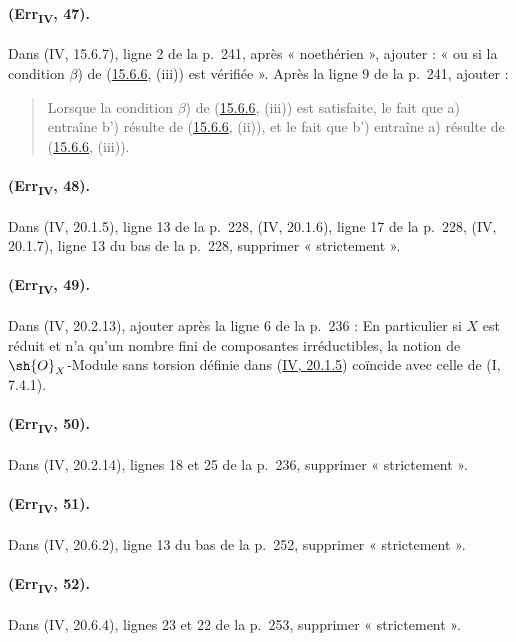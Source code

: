 \paragraph{(Err\textsubscript{IV}, 47).}
Dans (IV, 15.6.7), ligne 2 de la p.~241, après « noethérien », ajouter :
« ou si la condition $\beta$) de
({\hyperlink{ega4.c04.prop.15-6-6}{15.6.6}}, (iii)) est vérifiée ».
Après la ligne 9 de la p.~241, ajouter :
\begin{quote}
Lorsque la condition $\beta$) de
({\hyperlink{ega4.c04.prop.15-6-6}{15.6.6}}, (iii)) est satisfaite, le
fait que a) entraîne b') résulte de
({\hyperlink{ega4.c04.prop.15-6-6}{15.6.6}}, (ii)), et le fait que b')
entraîne a) résulte de
({\hyperlink{ega4.c04.prop.15-6-6}{15.6.6}}, (iii)).
\end{quote}

\paragraph{(Err\textsubscript{IV}, 48).}
Dans (IV, 20.1.5), ligne 13 de la p.~228, (IV, 20.1.6), ligne 17 de la
p.~228, (IV, 20.1.7), ligne 13 du bas de la p.~228, supprimer
« strictement ».

\paragraph{(Err\textsubscript{IV}, 49).}
Dans (IV, 20.2.13), ajouter après la ligne 6 de la p.~236 : En
particulier si $X$ est réduit et n'a qu'un nombre fini de composantes
irréductibles, la notion de $\sh{O}_X$-Module sans torsion définie dans
({\hyperlink{ega4.c04.statement.20-1-5}{IV, 20.1.5}}) coïncide avec
celle de (I, 7.4.1).

\paragraph{(Err\textsubscript{IV}, 50).}
Dans (IV, 20.2.14), lignes 18 et 25 de la p.~236, supprimer
« strictement ».

\paragraph{(Err\textsubscript{IV}, 51).}
Dans (IV, 20.6.2), ligne 13 du bas de la p.~252, supprimer
« strictement ».

\paragraph{(Err\textsubscript{IV}, 52).}
Dans (IV, 20.6.4), lignes 23 et 22 de la p.~253, supprimer
« strictement ».

